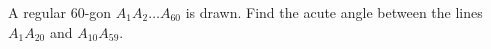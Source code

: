 A regular $60$-gon $A_1A_2\ldots A_{60}$ is drawn. Find the acute angle between the lines $A_1A_{20}$ and $A_{10}A_{59}$.
